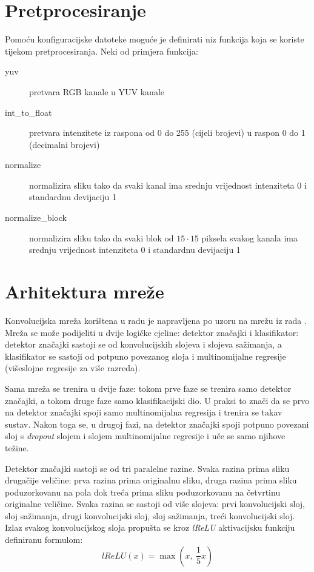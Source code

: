 \documentclass[times, utf8, diplomski, numeric]{fer}
\begin{document}
\section{Pretprocesiranje}
Pomoću konfiguracijske datoteke moguće je definirati niz funkcija koja se koriste tijekom pretprocesiranja. Neki od primjera funkcija:
\begin{description}
  \item[yuv] pretvara RGB kanale u YUV kanale
  \item[int\_to\_float] pretvara intenzitete iz raspona od 0 do 255 (cijeli brojevi) u raspon 0 do 1 (decimalni brojevi)
  \item[normalize] normalizira sliku tako da svaki kanal ima srednju vrijednost intenziteta 0 i standardnu devijaciju 1
  \item[normalize\_block] normalizira sliku tako da svaki blok od $15 \cdot 15$ piksela svakog kanala ima srednju vrijednost intenziteta 0 i standardnu devijaciju 1
\end{description}


\section{Arhitektura mreže}
\label{chap:net_architecture}

Konvolucijska mreža korištena u radu je napravljena po uzoru na mrežu iz rada \cite{farabet_pami}. Mreža se može podijeliti u dvije logičke cjeline: detektor značajki i klasifikator: detektor značajki sastoji se od konvolucijskih slojeva i slojeva sažimanja, a klasifikator se sastoji od potpuno povezanog sloja i multinomijalne regresije (višeslojne regresije za više razreda).

Sama mreža se trenira u dvije faze: tokom prve faze se trenira samo detektor značajki, a tokom druge faze samo klasifikacijski dio. U praksi to znači da se prvo na detektor značajki spoji samo multinomijalna regresija i trenira se takav sustav. Nakon toga se, u drugoj fazi, na detektor značajki spoji potpuno povezani sloj s \emph{dropout} slojem i slojem multinomijalne regresije i uče se samo njihove težine.

Detektor značajki sastoji se od tri paralelne razine. Svaka razina prima sliku drugačije veličine: prva razina prima originalnu sliku, druga razina prima sliku poduzorkovanu na pola dok treća prima sliku poduzorkovanu na četvrtinu originalne veličine. Svaka razina se sastoji od više slojeva: prvi konvolucijski sloj, sloj sažimanja, drugi konvolucijski sloj, sloj sažimanja, treći konvolucijski sloj. Izlaz svakog konvolucijskog sloja propušta se kroz \textit{lReLU} aktivacijsku funkciju definiranu formulom:
\begin{equation}
  lReLU( x ) = \max(x,\ \frac{1}{5} x)
\end{equation}
\end{document}
